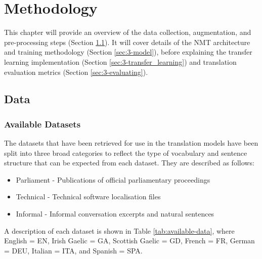 \chapter{Methodology}

This chapter will provide an overview of the data collection, augmentation, and pre-processing steps (Section \ref{sec:3-data}). It will cover details of the \acrshort{NMT} architecture and training methodology (Section \ref{sec:3-model}), before explaining the transfer learning implementation (Section \ref{sec:3-transfer_learning}) and translation evaluation metrics (Section \ref{sec:3-evaluating}).



\newpage

\section{Data}
\label{sec:3-data}
\subsection{Available Datasets}


The datasets that have been retrieved for use in the translation models have been split into three broad categories to reflect the type of vocabulary and sentence structure that can be expected from each dataset. They are described as follows:

\begin{itemize}
    \item Parliament - Publications of official parliamentary proceedings
    \item Technical - Technical software localisation files
    \item Informal - Informal conversation excerpts and natural sentences
\end{itemize}

A description of each dataset is shown in Table \ref{tab:available-data}, where English = EN, Irish Gaelic = GA, Scottish Gaelic = GD, French = FR, German = DEU, Italian = ITA, and Spanish = SPA.


